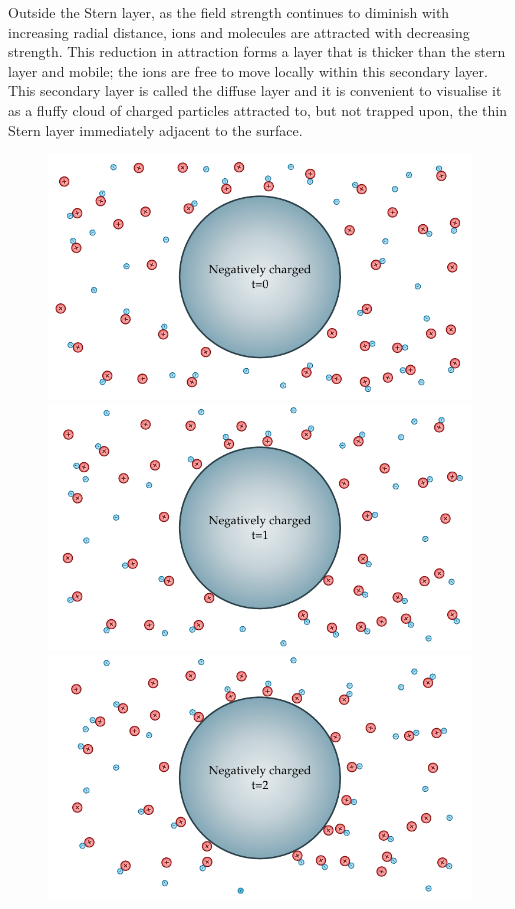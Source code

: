    Outside the Stern layer, as the field strength continues to diminish with increasing radial distance, ions and molecules are attracted with decreasing strength. This reduction in attraction forms a layer that is thicker than the stern layer and mobile; the ions are free to move locally within this secondary layer. This secondary layer is called the diffuse layer and it is convenient to visualise it as a fluffy cloud of charged particles attracted to, but not trapped upon, the thin Stern layer immediately adjacent to the surface.



   \begin{figure}
       \begin{center}
           \includegraphics{content/introduction/graphics/doubleLayer_t0.pdf}
           \includegraphics{content/introduction/graphics/doubleLayer_t1.pdf}
           \includegraphics{content/introduction/graphics/doubleLayer_t2.pdf}

\end{center}
\end{figure}
